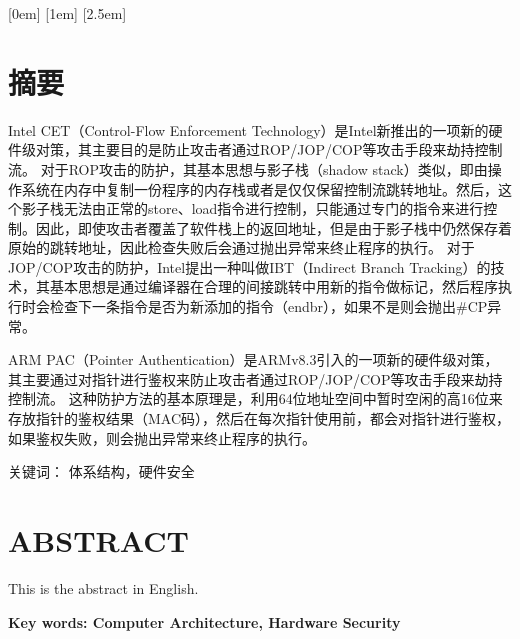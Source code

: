 %
%

[0em]{\bfseries}{\contentspush{\thecontentslabel \quad}}{}{\contentspage}
[1em]{}{\contentspush{\thecontentslabel \quad}}{}{\contentspage}
[2.5em]{}{\contentspush{\thecontentslabel \quad}}{}{\contentspage}
\makeatletter
\def\@dotsep{0.5}
\makeatother

\chapter*{摘要}

Intel CET（Control-Flow Enforcement Technology）是Intel新推出的一项新的硬件级对策，其主要目的是防止攻击者通过ROP/JOP/COP等攻击手段来劫持控制流。
对于ROP攻击的防护，其基本思想与影子栈（shadow stack）类似，即由操作系统在内存中复制一份程序的内存栈或者是仅仅保留控制流跳转地址。然后，这个影子栈无法由正常的store、load指令进行控制，只能通过专门的指令来进行控制。因此，即使攻击者覆盖了软件栈上的返回地址，但是由于影子栈中仍然保存着原始的跳转地址，因此检查失败后会通过抛出异常来终止程序的执行。
对于JOP/COP攻击的防护，Intel提出一种叫做IBT（Indirect Branch Tracking）的技术，其基本思想是通过编译器在合理的间接跳转中⽤新的指令做标记，然后程序执行时会检查下一条指令是否为新添加的指令（endbr），如果不是则会抛出\#CP异常。

ARM PAC（Pointer Authentication）是ARMv8.3引入的一项新的硬件级对策，其主要通过对指针进行鉴权来防止攻击者通过ROP/JOP/COP等攻击手段来劫持控制流。
这种防护方法的基本原理是，利用64位地址空间中暂时空闲的高16位来存放指针的鉴权结果（MAC码），然后在每次指针使用前，都会对指针进行鉴权，如果鉴权失败，则会抛出异常来终止程序的执行。

\vspace{1em}

\noindent \heiti 关键词：
\songti 体系结构，硬件安全

\chapter*{\bfseries ABSTRACT}

This is the abstract in English.

\vspace{1em}

\noindent \bfseries Key words:
\normalfont Computer Architecture, Hardware Security

